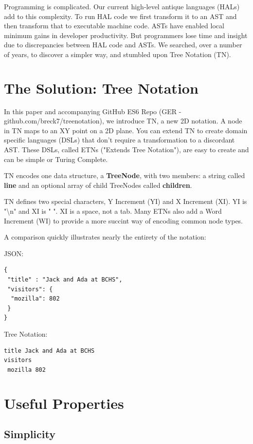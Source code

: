 \documentclass[journal]{IEEEtran}
\begin{document}
Programming is complicated. Our current high-level antique languages (HALs) add to this complexity. To run HAL code we first transform it to an AST and then transform that to executable machine code. ASTs have enabled local minimum gains in developer productivity. But programmers lose time and insight due to discrepancies between HAL code and ASTs. We searched, over a number of years, to discover a simpler way, and stumbled upon Tree Notation (TN).

\section{The Solution: Tree Notation}

In this paper and accompanying GitHub ES6 Repo (GER - github.com/breck7/treenotation), we introduce TN, a new 2D notation. A node in TN maps to an XY point on a 2D plane. You can extend TN to create domain specific languages (DSLs) that don't require a transformation to a discordant AST. These DSLs, called ETNs ("Extends Tree Notation"), are easy to create and can be simple or Turing Complete.

TN encodes one data structure, a \textbf{TreeNode}, with two members: a string called \textbf{line} and an optional array of child TreeNodes called \textbf{children}.

TN defines two special characters, Y Increment (YI) and X Increment (XI). YI is "\textbackslash n" and XI is " ".  XI is a space, not a tab. Many ETNs also add a Word Increment (WI) to provide a more succint way of encoding common node types.

A comparison quickly illustrates nearly the entirety of the notation:

JSON:

\begin{lstlisting}
{
 "title" : "Jack and Ada at BCHS",
 "visitors": {
  "mozilla": 802
 }
}
\end{lstlisting}

Tree Notation:

\begin{lstlisting}
title Jack and Ada at BCHS
visitors
 mozilla 802
\end{lstlisting}

\section{Useful Properties}

\subsection{Simplicity}
\end{document}
